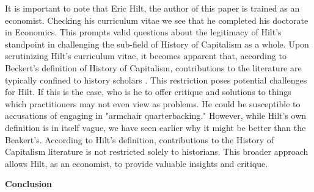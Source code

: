 \documentclass[10pt]{article}
\newcommand{\bb}{\bigbreak\noindent}
\begin{document}
\begin{spacing}{1.5}
		
		\bb
		It is important to note that Eric Hilt, the author of this paper is trained as an economist. Checking his curriculum vitae we see that he completed his doctorate in Economics. This prompts valid questions about the legitimacy of Hilt's standpoint in challenging the sub-field of History of Capitalism as a whole.
		Upon scrutinizing Hilt's curriculum vitae, it becomes apparent that, according to Beckert's definition of History of Capitalism, contributions to the literature are typically confined to history scholars \parencite{beckert2012history}. This restriction poses potential challenges for Hilt. If this is the case, who is he to offer critique and solutions to things which practitioners may not even view as problems. He could be susceptible to accusations of engaging in "armchair quarterbacking." However, while Hilt's own definition is in itself vague, we have seen earlier why it might be better than the Beakert's. According to Hilt's definition, contributions to the History of Capitalism literature is not restricted solely to historians. This broader approach allows Hilt, as an economist, to provide valuable insights and critique.
		
		
		
		
		\bb
		\textbf{Conclusion}\\
		
		
		
		\pagebreak
		\printbibliography
		
	\end{spacing}
\end{document}
